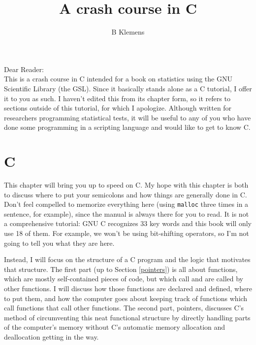 \documentclass[12pt]{article}
\begin{document}
	\title{A crash course in C}
	\author{B Klemens}
	\maketitle


Dear Reader:\\
This is a crash course in C intended for a book on statistics using the
GNU Scientific Library (the GSL).  Since it basically stands alone as a
C tutorial, I offer it to you as such. I haven't edited this from
its chapter form, so it refers to sections outside of this tutorial,
for which I apologize. Although written for researchers programming
statistical tests, it will be useful to any of you who have done some
programming in a scripting language and would like to get to know C.

\vskip 1cm

\section{C}
\fi


\long{}

This chapter will bring you up to speed on C.  
My hope with this chapter is both to discuss where to put your semicolons
and how things are generally done in C. Don't feel compelled to memorize
everything here (using {\tt malloc} three times in a sentence, for
example), since the manual is always there for you to read.  It is not
a comprehensive tutorial: GNU C recognizes 33 key words and this book
will only use 18 of them. For example, we won't be using bit-shifting
operators, so I'm not going to tell you what they are here.

Instead, I will focus on the structure of a C program and the logic that
motivates that structure.  The first part (up to Section \ref{pointers})
is all about functions, which are mostly self-contained pieces of code,
but which call and are called by other functions. I will discuss how
those functions are declared and defined, where to put them, and how the
computer goes about keeping track of functions which call functions that
call other functions. The second part, pointers, discusses C's method
of circumventing this neat functional structure by directly handling
parts of the computer's memory without C's automatic memory allocation
and deallocation getting in the way.
\end{document}
